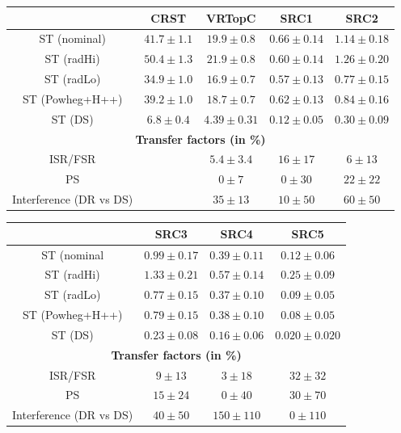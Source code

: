    \begin{table}[!h]
    \begin{center} \footnotesize

       \begin{tabular}{|c|c|c|c|c|}
       \noalign{\smallskip}\noalign{\smallskip}\hline
        & CRST & VRTopC & SRC1 & SRC2 \\ \hline
         \hline
          ST (nominal) &          $41.7\pm 1.1$ &         $19.9\pm 0.8$ &          $0.66\pm 0.14$&         $1.14\pm 0.18$\\
          ST (radHi)&   $50.4\pm 1.3$ &         $21.9\pm 0.8$ &          $0.60\pm 0.14$&         $1.26\pm 0.20$\\
ST  (radLo)&   $34.9\pm 1.0$ &         $16.9\pm 0.7$ &          $0.57\pm 0.13$&         $0.77\pm 0.15$\\
ST (Powheg+H++)&       $39.2\pm 1.0$ &         $18.7\pm 0.7$ &          $0.62\pm 0.13$&         $0.84\pm 0.16$\\
ST  (DS)&       $6.8\pm 0.4$ &       $4.39\pm 0.31$ &   $0.12\pm 0.05$&         $0.30\pm 0.09$\\
          \hline \hline 
          \multicolumn{5}{c}{\bf Transfer factors (in \%)} \\ \hline
          ISR/FSR& &      $5.4\pm3.4$&       $16\pm17$&      $6\pm13$\\
          PS &  &      $0\pm7$ &     $0\pm30$&       $22\pm22$\\
          Interference (DR vs DS) &  &      $35\pm13$ &      $10\pm50$&      $60\pm50$\\
          \hline
        \end{tabular}

        \begin{tabular}{|c|c|c|c|}
        \noalign{\smallskip}\noalign{\smallskip}\hline
        \hline
         & SRC3 & SRC4 & SRC5\\ \hline
         \hline
          ST (nominal&         $0.99\pm 0.17$&         $0.39\pm 0.11$&         $0.12\pm 0.06$\\
          ST  (radHi)&         $1.33\pm 0.21$&         $0.57\pm 0.14$&         $0.25\pm 0.09$\\
          ST (radLo)&         $0.77\pm 0.15$&         $0.37\pm 0.10$&         $0.09\pm 0.05$\\
	ST  (Powheg+H++)&         $0.79\pm 0.15$&         $0.38\pm 0.10$&         $0.08\pm 0.05$\\
	ST  (DS)&         $0.23\pm 0.08$&         $0.16\pm 0.06$&         $0.020\pm 0.020$\\
          \hline \hline 
          \multicolumn{4}{c}{\bf Transfer factors (in \%)} \\ \hline
          ISR/FSR&       $9\pm13$&       $3\pm18$&       $32\pm32$\\
          PS &      $15\pm24$&      $0\pm40$&       $30\pm70$\\
          Interference (DR vs DS)  &      $40\pm50$&      $150\pm110$&    $0\pm110$\\
          \hline
        \end{tabular}
        

\end{center}
\end{table}
